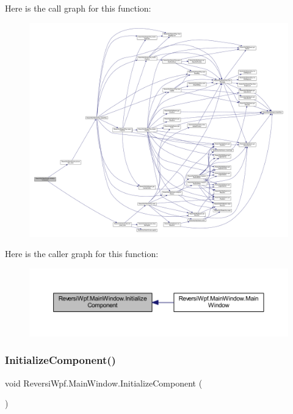 Here is the call graph for this function\+:
\nopagebreak
\begin{figure}[H]
\begin{center}
\leavevmode
\includegraphics[width=350pt]{class_reversi_wpf_1_1_main_window_a4cf9bc92cee02fa8e3b00fa56fb41c82_cgraph}
\end{center}
\end{figure}
Here is the caller graph for this function\+:
\nopagebreak
\begin{figure}[H]
\begin{center}
\leavevmode
\includegraphics[width=350pt]{class_reversi_wpf_1_1_main_window_a4cf9bc92cee02fa8e3b00fa56fb41c82_icgraph}
\end{center}
\end{figure}
\mbox{\label{class_reversi_wpf_1_1_main_window_a4cf9bc92cee02fa8e3b00fa56fb41c82}} 
\subsubsection{\texorpdfstring{Initialize\+Component()}{InitializeComponent()}\hspace{0.1cm}{\footnotesize\ttfamily [2/4]}}
{\footnotesize\ttfamily void Reversi\+Wpf.\+Main\+Window.\+Initialize\+Component (\begin{DoxyParamCaption}{ }\end{DoxyParamCaption})}



